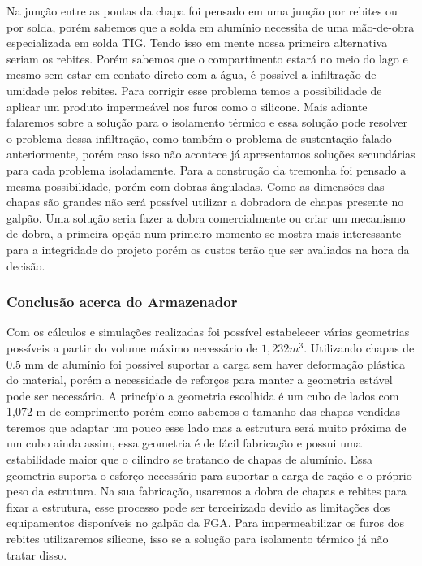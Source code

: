 Na junção entre as pontas da chapa foi pensado em uma junção por rebites ou por solda, porém sabemos que a solda em alumínio necessita de uma mão-de-obra especializada em solda TIG. Tendo isso em mente nossa primeira alternativa seriam os rebites. Porém sabemos que o compartimento estará no meio do lago e mesmo sem estar em contato direto com a água, é possível a infiltração de umidade  pelos rebites. Para corrigir esse problema temos a possibilidade de aplicar um produto impermeável nos furos como o silicone. Mais adiante falaremos sobre a solução para o isolamento térmico e essa solução pode resolver o problema dessa infiltração, como também o problema de sustentação falado anteriormente, porém caso isso não acontece já apresentamos soluções secundárias para cada problema isoladamente. Para a construção da tremonha foi pensado a mesma possibilidade, porém com dobras ânguladas. Como as dimensões das chapas são grandes não será possível utilizar a dobradora de chapas presente no galpão. Uma solução seria fazer a dobra comercialmente ou criar um mecanismo de dobra, a primeira opção num primeiro momento se mostra mais interessante para a integridade do projeto porém os custos terão que ser avaliados na hora da decisão.

\subsubsection{Conclusão acerca do Armazenador}

Com os cálculos e simulações realizadas foi possível estabelecer várias geometrias possíveis a partir do volume máximo necessário de  $1,232 m^3$. Utilizando chapas de 0.5 mm de alumínio foi possível suportar a carga sem haver deformação plástica do material, porém a necessidade de reforços para manter a geometria estável pode ser necessário. A princípio a geometria escolhida é um cubo de lados com 1,072 m de comprimento porém como sabemos o tamanho das chapas vendidas teremos que adaptar um pouco esse lado  mas a estrutura será muito próxima de um cubo ainda assim, essa geometria é de fácil fabricação e possui uma estabilidade maior que o cilindro se tratando de chapas de alumínio. Essa geometria suporta o esforço necessário para suportar a carga de ração e o próprio peso da estrutura. Na sua fabricação, usaremos a dobra de chapas e rebites para fixar a estrutura, esse processo pode ser terceirizado devido as limitações dos equipamentos disponíveis no galpão da FGA. Para impermeabilizar os furos dos rebites utilizaremos silicone, isso se a solução para isolamento térmico já não tratar disso.

